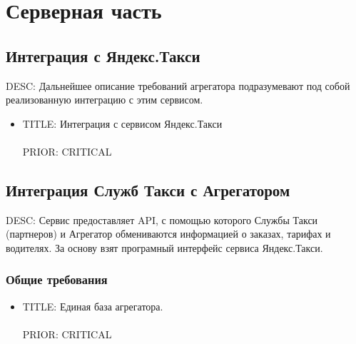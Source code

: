 \section{Серверная часть}

	\subsection{Интеграция с Яндекс.Такси}

		DESC: Дальнейшее описание требований агрегатора подразумевают под собой реализованную интеграцию с этим сервисом.  

		\begin{itemize}

		\item{
			TITLE: Интеграция с сервисом Яндекс.Такси\\
			\\
			PRIOR: CRITICAL\\
		}

		\end{itemize}

	\subsection{Интеграция Служб Такси с Агрегатором}

		DESC: Сервис предоставляет API, с помощью которого Службы Такси (партнеров) и Агрегатор обмениваются информацией о заказах, тарифах и водителях. За основу взят програмный интерфейс сервиса Яндекс.Такси.\\

		\subsubsection{Общие требования}

			\begin{itemize}

				\item {

					TITLE: Единая база агрегатора.\\
					\\
					PRIOR: CRITICAL\\

				}

			\end{itemize}


